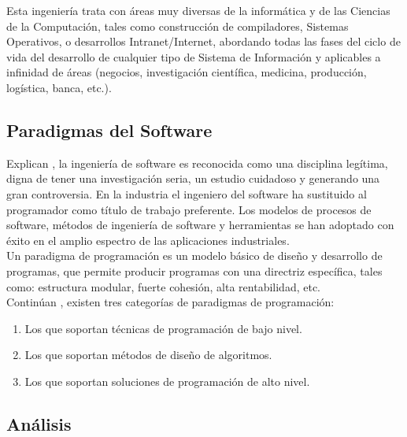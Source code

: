 \documentclass[12pt]{article}
\begin{document}
	\hspace{1.27cm}Esta ingeniería trata con áreas muy diversas de la informática y de las Ciencias de la Computación, tales como construcción de compiladores, Sistemas Operativos, o desarrollos Intranet/Internet, abordando todas las fases del ciclo de vida del desarrollo de cualquier tipo de Sistema de Información y aplicables a infinidad de áreas (negocios, investigación científica, medicina, producción, logística, banca, etc.).

	\subsection{Paradigmas del Software}

	\hspace{1.27cm}Explican \textcite{maida_metodologias_2015}, la ingeniería de software es reconocida como una disciplina legítima, digna de tener una investigación seria, un estudio cuidadoso y generando una gran controversia. En la industria el ingeniero del software ha sustituido al programador como título de trabajo preferente. Los modelos de procesos de software, métodos de ingeniería de software y herramientas se han adoptado con éxito en el amplio espectro de las aplicaciones industriales. \\

	\hspace{1.27cm}Un paradigma de programación es un modelo básico de diseño y desarrollo de programas, que	permite producir programas con una directriz específica, tales como: estructura modular, fuerte cohesión, alta rentabilidad, etc. \\

	\hspace{1.27cm}Continúan \textcite{maida_metodologias_2015}, existen tres categorías de paradigmas de programación:

	\begin{enumerate}[left=1.27cm]
		\item Los que soportan técnicas de programación de bajo nivel.
		\item Los que soportan métodos de diseño de algoritmos.
		\item Los que soportan soluciones de programación de alto nivel.
	\end{enumerate}

	\subsection{Análisis}
\end{document}
